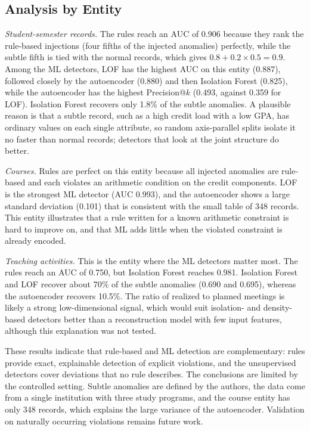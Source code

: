 \documentclass[conference]{IEEEtran}
\begin{document}
\subsection{Analysis by Entity}
\textit{Student-semester records.} The rules reach an AUC of 0.906 because they rank the rule-based injections (four fifths of the injected anomalies) perfectly, while the subtle fifth is tied with the normal records, which gives $0.8+0.2\times0.5=0.9$. Among the ML detectors, LOF has the highest AUC on this entity (0.887), followed closely by the autoencoder (0.880) and then Isolation Forest (0.825), while the autoencoder has the highest Precision@$k$ (0.493, against 0.359 for LOF). Isolation Forest recovers only 1.8\% of the subtle anomalies. A plausible reason is that a subtle record, such as a high credit load with a low GPA, has ordinary values on each single attribute, so random axis-parallel splits isolate it no faster than normal records; detectors that look at the joint structure do better.

\textit{Courses.} Rules are perfect on this entity because all injected anomalies are rule-based and each violates an arithmetic condition on the credit components. LOF is the strongest ML detector (AUC 0.993), and the autoencoder shows a large standard deviation (0.101) that is consistent with the small table of 348 records. This entity illustrates that a rule written for a known arithmetic constraint is hard to improve on, and that ML adds little when the violated constraint is already encoded.

\textit{Teaching activities.} This is the entity where the ML detectors matter most. The rules reach an AUC of 0.750, but Isolation Forest reaches 0.981. Isolation Forest and LOF recover about 70\% of the subtle anomalies (0.690 and 0.695), whereas the autoencoder recovers 10.5\%. The ratio of realized to planned meetings is likely a strong low-dimensional signal, which would suit isolation- and density-based detectors better than a reconstruction model with few input features, although this explanation was not tested.

These results indicate that rule-based and ML detection are complementary: rules provide exact, explainable detection of explicit violations, and the unsupervised detectors cover deviations that no rule describes. The conclusions are limited by the controlled setting. Subtle anomalies are defined by the authors, the data come from a single institution with three study programs, and the course entity has only 348 records, which explains the large variance of the autoencoder. Validation on naturally occurring violations remains future work.
\end{document}
